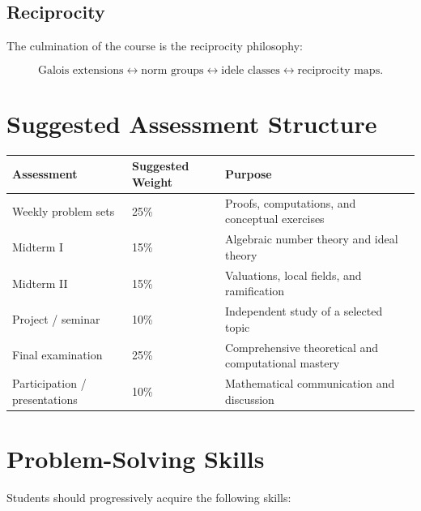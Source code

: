 \documentclass[11pt,a4paper]{article}
\begin{document}
\subsection{Reciprocity}

The culmination of the course is the reciprocity philosophy:

\[
\boxed{
\text{Galois extensions}
\longleftrightarrow
\text{norm groups}
\longleftrightarrow
\text{idele classes}
\longleftrightarrow
\text{reciprocity maps}.
}
\]

\section{Suggested Assessment Structure}

\begin{longtable}{p{}p{}p{}}
\toprule
\textbf{Assessment} & \textbf{Suggested Weight} &
\textbf{Purpose} \\
\midrule
Weekly problem sets & 25\% &
Proofs, computations, and conceptual exercises \\

Midterm I & 15\% &
Algebraic number theory and ideal theory \\

Midterm II & 15\% &
Valuations, local fields, and ramification \\

Project / seminar & 10\% &
Independent study of a selected topic \\

Final examination & 25\% &
Comprehensive theoretical and computational mastery \\

Participation / presentations & 10\% &
Mathematical communication and discussion \\
\bottomrule
\end{longtable}

\section{Problem-Solving Skills}

Students should progressively acquire the following skills:
\end{document}
